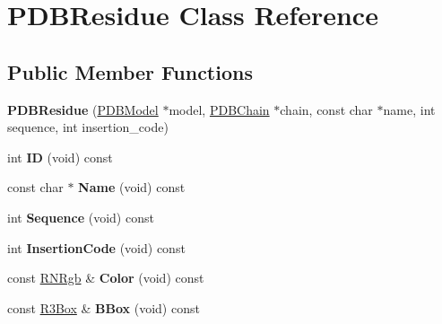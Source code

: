 \hypertarget{class_p_d_b_residue}{}\section{P\+D\+B\+Residue Class Reference}
\label{class_p_d_b_residue}
\subsection*{Public Member Functions}
\begin{DoxyCompactItemize}
\item 
{\bfseries P\+D\+B\+Residue} (\hyperlink{class_p_d_b_model}{P\+D\+B\+Model} $\ast$model, \hyperlink{class_p_d_b_chain}{P\+D\+B\+Chain} $\ast$chain, const char $\ast$name, int sequence, int insertion\+\_\+code)\hypertarget{class_p_d_b_residue_acaf63b69ff008288a0cda02cf734837b}{}\label{class_p_d_b_residue_acaf63b69ff008288a0cda02cf734837b}

\item 
int {\bfseries ID} (void) const \hypertarget{class_p_d_b_residue_a3894fad4550d682464420de3d3ba01fb}{}\label{class_p_d_b_residue_a3894fad4550d682464420de3d3ba01fb}

\item 
const char $\ast$ {\bfseries Name} (void) const \hypertarget{class_p_d_b_residue_a590844de1350c9e513f5645521d4c84a}{}\label{class_p_d_b_residue_a590844de1350c9e513f5645521d4c84a}

\item 
int {\bfseries Sequence} (void) const \hypertarget{class_p_d_b_residue_a1833be2a5ee84ba09a3e9a658ed516a5}{}\label{class_p_d_b_residue_a1833be2a5ee84ba09a3e9a658ed516a5}

\item 
int {\bfseries Insertion\+Code} (void) const \hypertarget{class_p_d_b_residue_a056f295d79d8d12c23a62e7b1619a303}{}\label{class_p_d_b_residue_a056f295d79d8d12c23a62e7b1619a303}

\item 
const \hyperlink{class_r_n_rgb}{R\+N\+Rgb} \& {\bfseries Color} (void) const \hypertarget{class_p_d_b_residue_a9be2ff81f6ae89cb30f195b8ce68bfaa}{}\label{class_p_d_b_residue_a9be2ff81f6ae89cb30f195b8ce68bfaa}

\item 
const \hyperlink{class_r3_box}{R3\+Box} \& {\bfseries B\+Box} (void) const \hypertarget{class_p_d_b_residue_ad8cf12d2ed16bec01b42275c92d2024d}{}\label{class_p_d_b_residue_ad8cf12d2ed16bec01b42275c92d2024d}


\end{DoxyCompactItemize}
